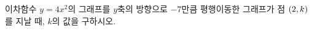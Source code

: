 이차함수 $y=4x^2$의 그래프를 $y$축의 방향으로 $-7$만큼 평행이동한 그래프가 점 $(2{,}\mkern3mu\mathopen{}k)$를 지날 때, $k$의 값을 구하시오.
